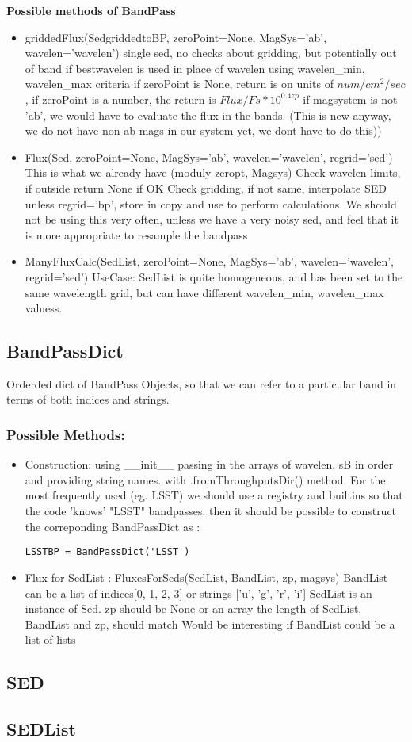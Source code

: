 \documentclass{article}[12pt]
\begin{document}
\textbf{Possible methods of BandPass}
\begin{itemize}
    \item griddedFlux(SedgriddedtoBP, zeroPoint=None, MagSys='ab', wavelen='wavelen') 
        single sed, no checks about gridding, but potentially out of band if bestwavelen is used in place of wavelen using wavelen\_min, wavelen\_max criteria
        if zeroPoint is None, return is on units of $num/cm^2/sec$, if zeroPoint is a number, the return is $Flux/ Fs * 10^{0.4 zp}$
        if magsystem is not 'ab', we would have to evaluate the flux in the bands. (This is new anyway, we do not have non-ab mags in our system yet, we dont have to do this))
    \item Flux(Sed, zeroPoint=None, MagSys='ab', wavelen='wavelen', regrid='sed') 
        This is what we already have (moduly zeropt, Magsys)
        Check wavelen limits, if outside return None  if OK
        Check gridding, if not same, interpolate SED unless regrid='bp', store in copy and use to perform calculations. We should not be using this very often,
       unless we have a very noisy sed, and feel that it is more appropriate to
       resample the bandpass 
   \item  ManyFluxCalc(SedList, zeroPoint=None, MagSys='ab', wavelen='wavelen', regrid='sed')
       UseCase: SedList is quite homogeneous, and has been set to the same wavelength grid, but can have different wavelen\_min,  wavelen\_max valuess.  

\end{itemize}      
\subsection{BandPassDict}
    Orderded dict of BandPass Objects, so that we can refer to a particular band in terms of both indices and strings.
\subsubsection{Possible Methods:}
 \begin{itemize}
     \item Construction: using \_\_init\_\_ passing in the arrays of wavelen, sB in order and providing string names. with .fromThroughputsDir() method. For the most frequently used (eg. LSST) we should use a registry and builtins so that the code 'knows' "LSST" bandpasses. then it should be possible to construct the correponding BandPassDict as :
\begin{verbatim}
LSSTBP = BandPassDict('LSST')
\end{verbatim}
\item Flux for SedList :
    FluxesForSeds(SedList, BandList, zp, magsys)
    BandList can be a list of indices[0, 1, 2, 3] or strings ['u', 'g', 'r', 'i']
    SedList is an instance of Sed.
    zp should be None or an array
    the length of SedList, BandList and zp, should match
    Would be interesting if BandList could be a list of lists
    
\end{itemize}

\subsection{SED}
\subsection{SEDList}
\end{document}
